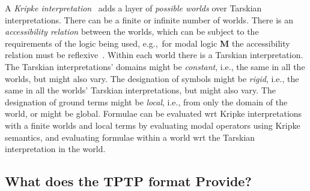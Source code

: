 \documentclass{ceurart}
\begin{document}
A \emph{Kripke interpretation}~\cite{Kri63} adds a layer of \emph{possible worlds} over Tarskian 
interpretations.
There can be a finite or infinite number of worlds.
There is an \emph{accessibility relation} between the worlds, which can be subject to the
requirements of the logic being used, e.g.,~for modal logic \textbf{M} the accessibility 
relation must be reflexive~\cite{Gar18}.
Within each world there is a Tarskian interpretation. 
The Tarskian interpretations' domains might be \emph{constant}, i.e., the same in all the worlds,
but might also vary.
The designation of symbols might be \emph{rigid}, i.e., the same in all the worlds' Tarskian 
interpretations, but might also vary.
The designation of ground terms might be \emph{local}, i.e., from only the domain of the world,
or might be global.
Formulae can be evaluated wrt Kripke interpretations with a finite worlds and local terms by
evaluating modal operators using Kripke semantics, and
evaluating formulae within a world wrt the Tarskian interpretation in the world.

\subsection{What does the TPTP format Provide?}
\label{TPTPProvides}
\end{document}
